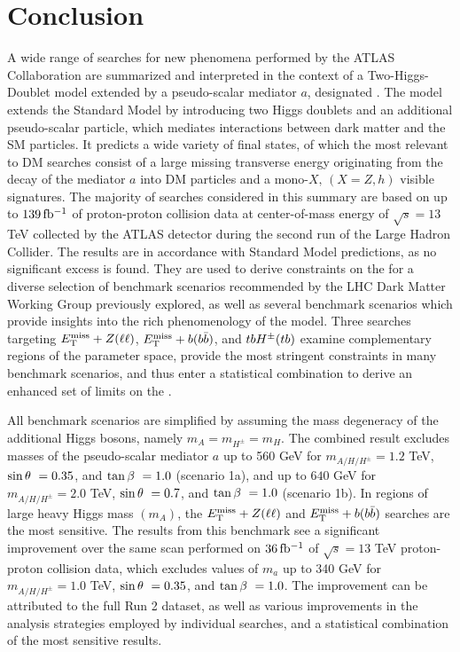 \section{Conclusion}

A wide range of searches for new phenomena performed by the ATLAS Collaboration are summarized and interpreted in the context of a Two-Higgs-Doublet model extended by a pseudo-scalar mediator $a$, designated \hdma. The model extends the Standard Model by introducing two Higgs doublets and an additional pseudo-scalar particle, which mediates interactions between dark matter and the SM particles. It predicts a wide variety of final states, of which the most relevant to DM searches consist of a large missing transverse energy originating from the decay of the mediator $a$ into DM particles and a mono-$X,\,(X=Z,h)$ visible signatures. The majority of searches considered in this summary are based on up to $139\,\mbox{fb\(^{-1}\)}$ of proton-proton collision data at center-of-mass energy of $\sqrt{s}=13$ TeV collected by the ATLAS detector during the second run of the Large Hadron Collider. The results are in accordance with Standard Model predictions, as no significant excess is found. They are used to derive constraints on the \thdma for a diverse selection of benchmark scenarios recommended by the LHC Dark Matter Working Group previously explored, as well as several benchmark scenarios which provide insights into the rich phenomenology of the model. Three searches targeting $E_{\mathrm{T}}^{\mathrm{miss}}+Z(\ell\ell)$, $E_{\mathrm{T}}^{\mathrm{miss}}+b(b\bar{b})$, and $tbH^{\pm}(tb)$ examine complementary regions of the parameter space, provide the most stringent constraints in many benchmark scenarios, and thus enter a statistical combination to derive an enhanced set of limits on the \hdma. 

All benchmark scenarios are simplified by assuming the mass degeneracy of the additional Higgs bosons, namely $m_A=m_{H^{\pm}}=m_H$. The combined result excludes masses of the pseudo-scalar mediator $a$ up to 560 GeV for $m_{A/H/H^{\pm}}=1.2$ TeV, $\sin\theta~=0.35$, and $\tan\beta~=1.0$ (scenario 1a), and up to $640$ GeV for $m_{A/H/H^{\pm}}=2.0$ TeV, $\sin\theta~=0.7$, and $\tan\beta~=1.0$ (scenario 1b). In regions of large heavy Higgs mass $(m_A)$, the $E_{\mathrm{T}}^{\mathrm{miss}}+Z(\ell\ell)$ and $E_{\mathrm{T}}^{\mathrm{miss}}+b(b\bar{b})$ searches are the most sensitive. The results from this benchmark see a significant improvement over the same scan performed on $36\,\mbox{fb\(^{-1}\)}$ of $\sqrt{s}=13$ TeV proton-proton collision data, which excludes values of $m_a$ up to 340 GeV for $m_{A/H/H^{\pm}}=1.0$ TeV, $\sin\theta~=0.35$, and $\tan\beta~=1.0$. The improvement can be attributed to the full Run 2 dataset, as well as various improvements in the analysis strategies employed by individual searches, and a statistical combination of the most sensitive results.

